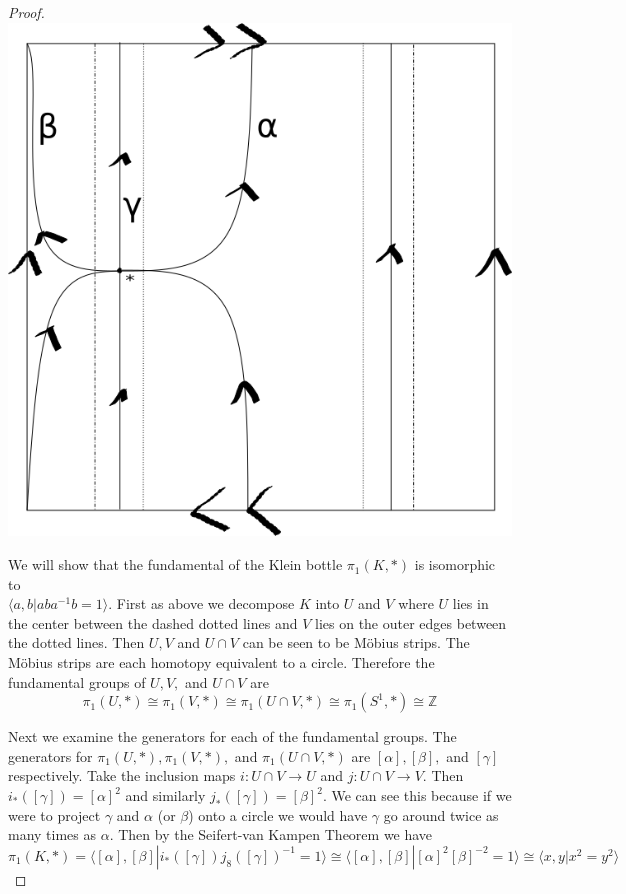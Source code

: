 \documentclass[10pt]{article}
\newcommand{\bb}[1]{\mathbb{#1}}
\theoremstyle{plain}
\theoremstyle{remark}
\begin{document}
\begin{proof}
  \includegraphics[scale=.5]{klein}

  We will show that the fundamental of the Klein bottle $\pi_1(K,*)$ is
  isomorphic to \\$\langle a,b|aba^{-1}b=1\rangle$. First as above we decompose
  $K$ into $U$ and $V$ where $U$ lies in the center between the dashed dotted lines
  and $V$ lies on the outer edges between the dotted lines. Then
  $U,V$ and $U\cap V$ can be seen to be M\"obius strips.
  The M\"obius strips are each homotopy equivalent to a circle. Therefore
  the fundamental groups of $U,V,$ and $U\cap V$ are
  \[ \pi_1(U,*)\cong \pi_1(V,*)\cong \pi_1(U\cap V,*)\cong \pi_1(S^1,*)\cong\bb{Z}\]

  Next we examine the generators for each of the fundamental groups. The generators
  for $\pi_1(U,*),\pi_1(V,*),$ and $\pi_1(U\cap V,*)$ are $[\alpha],[\beta],$ and $[\gamma]$ respectively.
  Take the inclusion maps $i:U\cap V\rightarrow U$ and $j:U\cap V \rightarrow V$. Then
  $i_*([\gamma])=[\alpha]^2$ and similarly $j_*([\gamma])=[\beta]^2$. We can see this because if we were
  to project $\gamma$ and $\alpha$ (or $\beta$) onto a circle we would have $\gamma$ go around twice as
  many times as $\alpha$. Then by the Seifert-van Kampen Theorem we have
  \[\pi_1(K,*)=\langle [\alpha],[\beta] | i_*([\gamma])j_8([\gamma])^{-1}=1 \rangle\cong\langle [\alpha],[\beta]|[\alpha]^2[\beta]^{-2}=1\rangle \cong \langle x,y| x^2=y^2\rangle\]


\end{proof}
\end{document}
